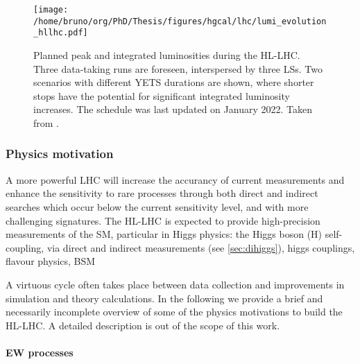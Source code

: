 \documentclass[11pt]{article}
\begin{document}
\begin{figure}
\texttt{[image: /home/bruno/org/PhD/Thesis/figures/hgcal/lhc/lumi\_evolution\_hllhc.pdf]}
\caption{\label{fig:lumi_plans_hllhc}Planned peak and integrated luminosities during the \ac{HL-LHC}. Three data-taking runs are foreseen, interspersed by three \acp{LS}. Two scenarios with different \ac{YETS} durations are shown, where shorter stops have the potential for significant integrated luminosity increases. The schedule was last updated on January 2022. Taken from \cite{hllhc_evolution_paper2}.}
\end{figure}
\subsubsection{Physics motivation}
\label{sec:org6c2787b}
\label{sec:hllhc_physics}

A more powerful \ac{LHC} will increase the accurancy of current measurements and enhance the sensitivity to rare processes through both direct and indirect searches which occur below the current sensitivity level, and with more challenging signatures.
The \ac{HL-LHC} is expected to provide high-precision measurements of the \ac{SM}, particular in Higgs physics: the Higgs boson (H) self-coupling, via direct and indirect measurements (see \cref{sec:dihiggs}), higgs couplings, flavour physics, BSM

A virtuous cycle often takes place between data collection and improvements in simulation and theory calculations.
In the following we provide a brief and necessarily incomplete overview of some of the physics motivations to build the \ac{HL-LHC}.
A detailed description is out of the scope of this work.


\paragraph{EW processes}
\end{document}
